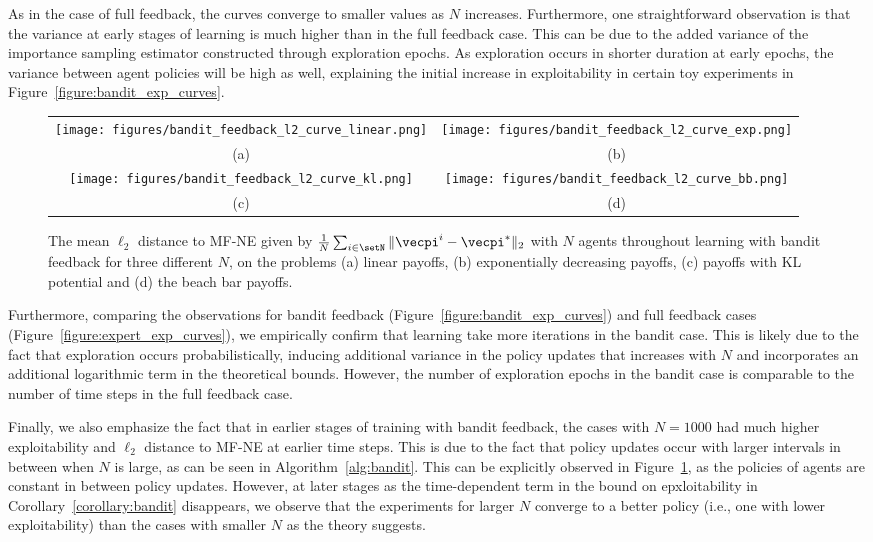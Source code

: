 As in the case of full feedback, the curves converge to smaller values as $N$ increases.
Furthermore, one straightforward observation is that the variance at early stages of learning is much higher than in the full feedback case.
This can be due to the added variance of the importance sampling estimator constructed through exploration epochs.
As exploration occurs in shorter duration at early epochs, the variance between agent policies will be high as well, explaining the initial increase in exploitability in certain toy experiments in Figure~\ref{figure:bandit_exp_curves}.

\begin{figure}[h]
\centering
\begin{tabular}{cc}
  \texttt{[image: figures/bandit\_feedback\_l2\_curve\_linear.png]} &   \texttt{[image: figures/bandit\_feedback\_l2\_curve\_exp.png]} \\
(a) & (b) \\
\texttt{[image: figures/bandit\_feedback\_l2\_curve\_kl.png]} &   \texttt{[image: figures/bandit\_feedback\_l2\_curve\_bb.png]} \\
(c) & (d)
\end{tabular}
\caption{
The mean $\ell_2$ distance to MF-NE given by $\frac{1}{N}\sum_{i\in\setN} \| \vecpi^i - \vecpi^*\|_2$ with $N$ agents throughout learning with bandit feedback for three different $N$, on the problems (a) linear payoffs, (b) exponentially decreasing payoffs, (c) payoffs with KL potential and (d) the beach bar payoffs.
}
\label{figure:bandit_l2_curves}
\end{figure}

Furthermore, comparing the observations for bandit feedback (Figure~\ref{figure:bandit_exp_curves}) and full feedback cases (Figure~\ref{figure:expert_exp_curves}), we empirically confirm that learning take more iterations in the bandit case.
This is likely due to the fact that exploration occurs probabilistically, inducing additional variance in the policy updates that increases with $N$ and incorporates an additional logarithmic term in the theoretical bounds.
However, the number of exploration epochs in the bandit case is comparable to the number of time steps in the full feedback case.

Finally, we also emphasize the fact that in earlier stages of training with bandit feedback, the cases with $N=1000$ had much higher exploitability and $\ell_2$ distance to MF-NE at earlier time steps.
This is due to the fact that policy updates occur with larger intervals in between when $N$ is large, as can be seen in Algorithm~\ref{alg:bandit}.
This can be explicitly observed in Figure~\ref{figure:bandit_l2_curves}, as the policies of agents are constant in between policy updates.
However, at later stages as the time-dependent term in the bound on epxloitability in Corollary~\ref{corollary:bandit} disappears, we observe that the experiments for larger $N$ converge to a better policy (i.e., one with lower exploitability) than the cases with smaller $N$ as the theory suggests.

